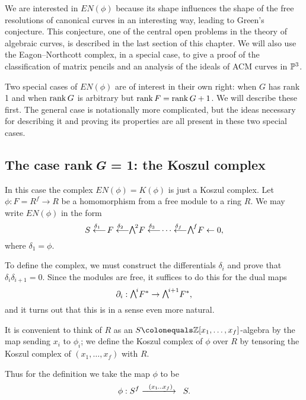 We
are interested in $EN(\phi)$ because its shape
influences the shape of the free resolutions of canonical curves in an
interesting way,
leading to Green's conjecture. This conjecture, one of the central open
problems in the theory of algebraic curves, is described in the last
section of this chapter. We will also use the Eagon--Northcott
complex, in a special case, to give a proof of the classification of
matrix pencils and an analysis of the ideals of ACM curves in ${\mathbb P}^{3}$.

Two special cases of $EN(\phi)$ are of interest in their own right: when
$G$ has rank 1 and when
$\operatorname{rank} G$ is arbitrary but $\operatorname{rank} F = \operatorname{rank} G + 1$.
We
will describe these first. The general case
is notationally more complicated, but the  ideas necessary for
describing it and proving its properties
 are all
present in these two special cases.


\subsection*{The case rank\,{\itshape G} = 1: the Koszul complex}

In this case the complex $EN(\phi) = K(\phi)$ is just a
 Koszul complex. Let $\phi:F = R^{f}\to R$ be a homomorphism from
a free module to a ring $R$. We may write $EN(\phi)$ in the form
$$
S \luto{\,\delta_{1}} \!F \luto{\,\delta_{2}}\!\! \mwedge^{2}F
\luto{\,\delta_{3}} \!\cdots \luto{\,\delta_{f}}\!\!\mwedge^{f}F\leftarrow 0, 
$$
where $\delta_{1} = \phi$.

To define the complex, we must construct the differentials $\delta_{i}$
and prove that
$\delta_{i}\delta_{i+1} = 0$. Since the modules are free, it suffices
to do this for the
dual maps
$$
\partial_{i}: \mwedge^{i}F^{*} \to \mwedge^{i+1}F^{*},
$$
and it turns out that this is in a sense even more natural.

It is convenient to think of $R$ as an $S \colonequals  \ZZ[x_{1},\dots,
x_{f}]$-algebra by the map sending
$x_{i}$ to $\phi_{i}$; we  define the Koszul complex of $\phi$ over $R$
%
by tensoring
the Koszul complex of $(x_{1}, \dots, x_{f})$ with $R$.

Thus for the definition we take the map $\phi$ to be
$$
\phi: S^{f}\ruuuto {\ \
(x_{1} \,\dots \, x_{f})
} \hskip0.7em S.
$$

